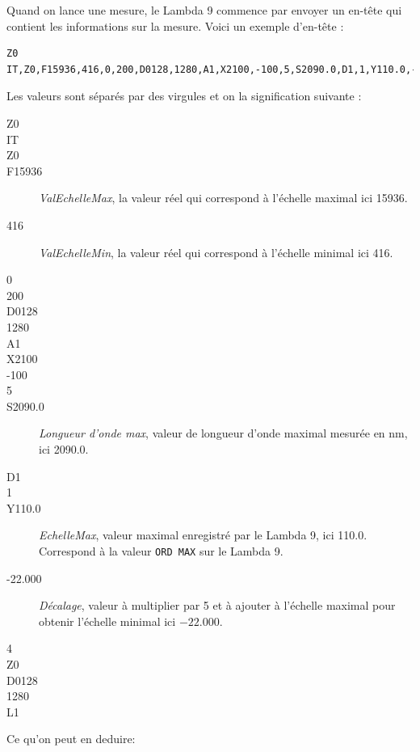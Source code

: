 \documentclass[a4paper, 12pt]{article}
\begin{document}
Quand on lance une mesure, le Lambda 9 commence par envoyer un en-tête qui contient les informations sur la mesure. Voici un exemple d'en-tête :
\begin{lstlisting}
Z0
IT,Z0,F15936,416,0,200,D0128,1280,A1,X2100,-100,5,S2090.0,D1,1,Y110.0,-22.000,4,Z0,D0128,1280,L1
\end{lstlisting}
Les valeurs sont séparés par des virgules et on la signification suivante :
\begin{description}
	\item[Z0]
	\item[IT]
	\item[Z0]
	\item[F15936] \emph{ValEchelleMax}, la valeur réel qui correspond à l'échelle maximal ici 15936.
	\item[416] \emph{ValEchelleMin}, la valeur réel qui correspond à l'échelle minimal ici 416.
	\item[0]
	\item[200]
	\item[D0128]
	\item[1280]
	\item[A1]
	\item[X2100]
	\item[-100]
	\item[5]
	\item[S2090.0] \emph{Longueur d'onde max}, valeur de longueur d'onde maximal mesurée en nm, ici 2090.0.
	\item[D1]
	\item[1]
	\item[Y110.0] \emph{EchelleMax}, valeur maximal enregistré par le Lambda 9, ici 110.0.
		Correspond à la valeur \verb|ORD MAX| sur le Lambda 9.
	\item[-22.000] \emph{Décalage}, valeur à multiplier par 5 et à ajouter à l'échelle maximal pour obtenir l'échelle minimal ici $-22.000$.
	\item[4]
	\item[Z0]
	\item[D0128]
	\item[1280]
	\item[L1]

\end{description}
Ce qu'on peut en deduire:
\end{document}
